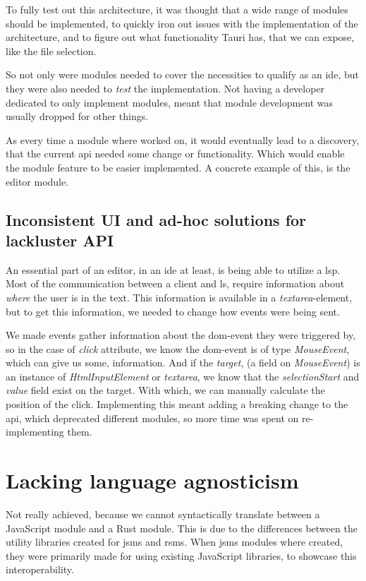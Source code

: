 To fully test out this architecture, it was thought that a wide range of modules
should be implemented, to quickly iron out issues with the implementation of the
architecture, and to figure out what functionality Tauri has, that we can
expose, like the file selection.

So not only were modules needed to cover the necessities to qualify as an
\gls*{ide}, but they were also needed to \textit{test} the implementation. Not
having a developer dedicated to only implement modules, meant that module
development was usually dropped for other things.

As every time a module where worked on, it would eventually lead to a discovery,
that the current \gls*{api} needed some change or functionality. Which would
enable the module feature to be easier implemented. A concrete example of this,
is the editor module.


\subsection{Inconsistent UI and ad-hoc solutions for lackluster API}

An essential part of an editor, in an \gls*{ide} at least, is being able to
utilize a \gls*{lsp}. Most of the communication between a client and \gls*{ls},
require information about \textit{where} the user is in the text. This
information is available in a \textit{textarea}-element, but to get this
information, we needed to change how events were being sent.

We made events gather information about the \gls*{dom}-event they were
triggered by, so in the case of \textit{click} attribute, we know the
\gls*{dom}-event is of type \textit{MouseEvent}, which can give us some,
information. And if the \textit{target}, (a field on \textit{MouseEvent}) is an
instance of \textit{HtmlInputElement} or \textit{textarea}, we know that the
\textit{selectionStart} and \textit{value} field exist on the target. With
which, we can manually calculate the position of the click. Implementing this
meant adding a breaking change to the \gls*{api}, which deprecated different
modules, so more time was spent on re-implementing them.


\section{Lacking language agnosticism} \label{sec:lla}

Not really achieved, because we cannot syntactically translate between a
JavaScript module and a Rust module. This is due to the differences between the
utility libraries created for \gls*{jsms} and \gls*{rsms}. When \gls*{jsms} modules
where created, they were primarily made for using existing JavaScript libraries,
to showcase this interoperability.

